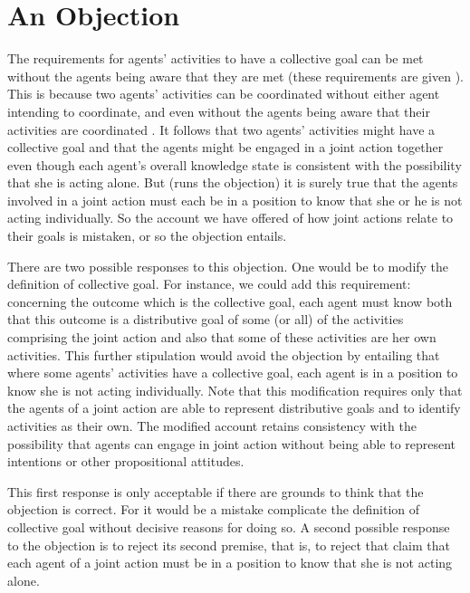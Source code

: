 \documentclass[12pt,a4paper]{extarticle}
\begin{document}
\section{An Objection
	\label{section_objection}
}
The requirements for agents' activities to have a collective goal can be met without the agents being aware that they are met 
(these requirements are given ).  
This is because two agents' activities can be coordinated without either agent intending to coordinate, and even without the agents being aware that their activities are coordinated \citep{Sebanz:2003kf, schmidt_understanding_2010}.
It follows that two agents' activities might have a collective goal 
and that the agents might be engaged in a joint action together
even though each agent's overall knowledge state is consistent with the possibility that she is acting alone.
But (runs the objection) it is surely true that the agents involved in a joint action must each be in a position to know that she or he is not acting individually.
So the account we have offered of how joint actions relate to their goals is mistaken, or so the objection entails.


There are two possible responses to this objection.  One would be to modify the definition of collective goal.
For instance, we could add this requirement: concerning the outcome which is the collective goal, each agent must know both that 
	this outcome is a distributive goal of some (or all) of the activities comprising the joint action 
	and also that 
	some of these activities are her own activities.
This further stipulation would avoid the objection by entailing that where some agents' activities have a collective goal, each agent is in a position to know she is not acting individually.
Note that this modification requires only that the agents of a joint action are able to represent distributive goals and to identify activities as their own.
The modified account retains consistency with the possibility that agents can engage in joint action without being able to represent intentions or other propositional attitudes.

This first response is only acceptable if there are grounds to think that the objection is correct.  
For it would be a mistake complicate the definition of collective goal  without decisive reasons for doing so.
A second possible response to the objection is to reject its second premise, 
	that is,
	to reject that claim that each agent of a joint action must be in a position to know that she is not acting alone.
	
\end{document}

